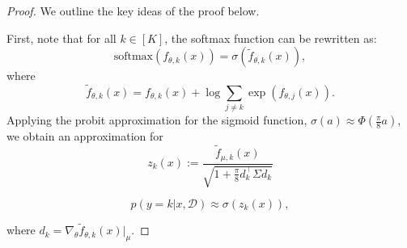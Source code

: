 \documentclass{article}
\begin{document}
\begin{proof}
We outline the key ideas of the proof below.

First, note that for all \( k \in [K] \), the softmax function can be rewritten as:
\begin{equation}
    \text{softmax}(f_{\theta,k}(x)) = \sigma(\tilde{f}_{\theta,k}(x)),
\end{equation}
where
\begin{equation}
    \tilde{f}_{\theta,k}(x) = f_{\theta,k}(x) + \log \sum_{j\neq k} \exp(f_{\theta, j}(x)).
\end{equation}
Applying the probit approximation for the sigmoid function, \( \sigma(a) \approx \Phi(\frac{\pi}{8}a) \), we obtain an approximation for 
\begin{equation}
    \label{zk_definition}
    z_k(x) := \frac{\tilde{f}_{\mu,k}(x)}{\sqrt{1+\frac{\pi}{8}d_k^{\intercal}\Sigma d_k}}
\end{equation}

\begin{equation}
    \label{softmax_approx}
    p (y = k | x, \mathcal{D}) \approx \sigma\left(z_k(x)\right),
\end{equation}

where \( d_k = \nabla_{\theta} \tilde{f}_{\theta,k}(x)|_{\mu} \).


\end{proof}
\end{document}
